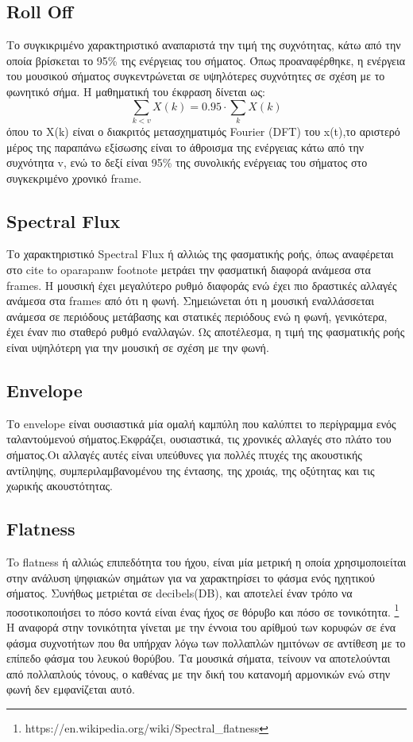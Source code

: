 \subsection{Roll Off}
 
 Το συγκικριμένο χαρακτηριστικό αναπαριστά την τιμή της συχνότητας, κάτω από την οποία βρίσκεται το 95\% της ενέργειας του σήματος. Όπως προαναφέρθηκε, η ενέργεια του μουσικού σήματος συγκεντρώνεται σε υψηλότερες συχνότητες σε σχέση με το φωνητικό σήμα. Η μαθηματική του έκφραση δίνεται ως:
 \begin{equation}
 \sum_{k<v} X(k) = 0.95 \cdot \sum_{k}X(k)
 \end{equation}
 όπου το X(k) είναι ο διακριτός μετασχηματιμός Fourier (DFT) του x(t),το αριστερό μέρος της παραπάνω εξίσωσης είναι το άθροισμα της ενέργειας κάτω από την συχνότητα v, ενώ το δεξί είναι 95\% της συνολικής ενέργειας του σήματος στο συγκεκριμένο χρονικό frame.

 \subsection{Spectral Flux}

 Το χαρακτηριστικό Spectral Flux ή αλλιώς της φασματικής ροής, όπως αναφέρεται στο 
 cite to oparapanw footnote
 μετράει την φασματική διαφορά ανάμεσα στα frames. Η μουσική έχει μεγαλύτερο ρυθμό διαφοράς ενώ έχει πιο δραστικές αλλαγές ανάμεσα στα frames από ότι η φωνή. Σημειώνεται ότι η μουσική εναλλάσσεται ανάμεσα σε περιόδους μετάβασης και στατικές περιόδους ενώ η φωνή, γενικότερα, έχει έναν πιο σταθερό ρυθμό εναλλαγών. Ως αποτέλεσμα, η τιμή της φασματικής ροής είναι υψηλότερη για την μουσική σε σχέση με την φωνή.

  \subsection{Envelope}

Το envelope είναι ουσιαστικά μία ομαλή καμπύλη που καλύπτει το περίγραμμα ενός ταλαντούμενού σήματος.Εκφράζει, ουσιαστικά, τις χρονικές αλλαγές στο πλάτο του σήματος.Οι αλλαγές αυτές είναι υπεύθυνες για πολλές πτυχές της ακουστικής αντίληψης, συμπεριλαμβανομένου της έντασης, της χροιάς, της οξύτητας και τις χωρικής ακουστότητας.


\subsection{Flatness}

To flatness ή αλλιώς επιπεδότητα του ήχου, είναι μία μετρική η οποία χρησιμοποιείται στην ανάλυση ψηφιακών σημάτων για να χαρακτηρίσει το φάσμα ενός ηχητικού σήματος. Συνήθως μετριέται σε decibels(DB), και αποτελεί έναν τρόπο να ποσοτικοποιήσει το πόσο κοντά είναι ένας ήχος σε θόρυβο και πόσο σε τονικότητα.  \footnote{https://en.wikipedia.org/wiki/Spectral\_flatness} Η αναφορά στην τονικότητα γίνεται με την έννοια του αρίθμού των κορυφών σε ένα φάσμα συχνοτήτων που θα υπήρχαν λόγω των πολλαπλών ημιτόνων σε αντίθεση με το επίπεδο φάσμα του λευκού θορύβου. Τα μουσικά σήματα, τείνουν να αποτελούνται από πολλαπλούς τόνους, ο καθένας με την δική του κατανομή αρμονικών ενώ στην φωνή δεν εμφανίζεται αυτό.


